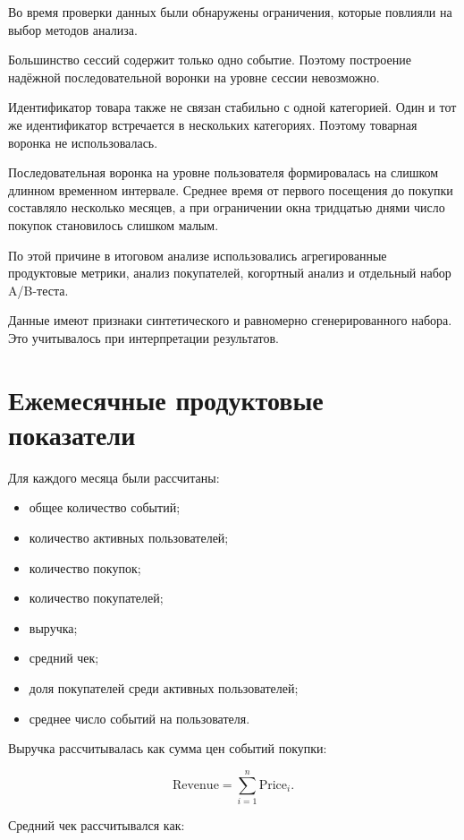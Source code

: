 \documentclass[12pt,a4paper]{extarticle}
\begin{document}
Во время проверки данных были обнаружены ограничения, которые повлияли
на выбор методов анализа.

Большинство сессий содержит только одно событие. Поэтому построение
надёжной последовательной воронки на уровне сессии невозможно.

Идентификатор товара также не связан стабильно с одной категорией.
Один и тот же идентификатор встречается в нескольких категориях.
Поэтому товарная воронка не использовалась.

Последовательная воронка на уровне пользователя формировалась на
слишком длинном временном интервале. Среднее время от первого посещения
до покупки составляло несколько месяцев, а при ограничении окна
тридцатью днями число покупок становилось слишком малым.

По этой причине в итоговом анализе использовались агрегированные
продуктовые метрики, анализ покупателей, когортный анализ и отдельный
набор A/B-теста.

Данные имеют признаки синтетического и равномерно сгенерированного
набора. Это учитывалось при интерпретации результатов.

\section{Ежемесячные продуктовые показатели}

Для каждого месяца были рассчитаны:

\begin{itemize}
    \item общее количество событий;
    \item количество активных пользователей;
    \item количество покупок;
    \item количество покупателей;
    \item выручка;
    \item средний чек;
    \item доля покупателей среди активных пользователей;
    \item среднее число событий на пользователя.
\end{itemize}

Выручка рассчитывалась как сумма цен событий покупки:

\[
\text{Revenue}
=
\sum_{i=1}^{n}
\text{Price}_{i}.
\]

Средний чек рассчитывался как:
\end{document}
